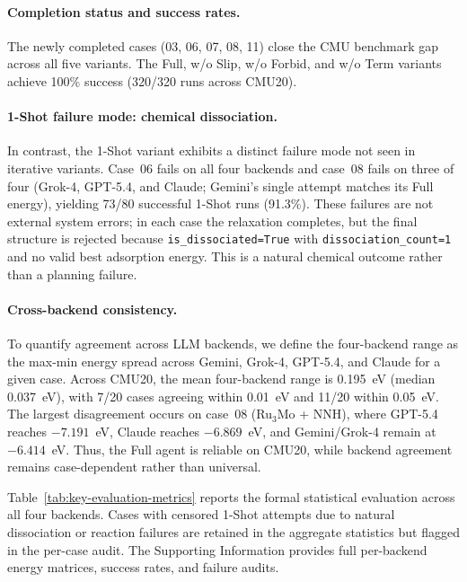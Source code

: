 \paragraph{Completion status and success rates.}
The newly completed cases (03, 06, 07, 08, 11) close the CMU benchmark gap across all five variants.
The Full, w/o Slip, w/o Forbid, and w/o Term variants achieve 100\% success (320/320 runs across CMU20).

\paragraph{1-Shot failure mode: chemical dissociation.}
In contrast, the 1-Shot variant exhibits a distinct failure mode not seen in iterative variants.
Case~06 fails on all four backends and case~08 fails on three of four (Grok-4, GPT-5.4, and Claude; Gemini's single attempt matches its Full energy), yielding 73/80 successful 1-Shot runs (91.3\%).
These failures are not external system errors; in each case the relaxation completes, but the final structure is rejected because \texttt{is\_dissociated=True} with \texttt{dissociation\_count=1} and no valid best adsorption energy.
This is a natural chemical outcome rather than a planning failure.

\paragraph{Cross-backend consistency.}
To quantify agreement across LLM backends, we define the four-backend range as the max-min energy spread across Gemini, Grok-4, GPT-5.4, and Claude for a given case.
Across CMU20, the mean four-backend range is 0.195~eV (median 0.037~eV), with 7/20 cases agreeing within 0.01~eV and 11/20 within 0.05~eV.
The largest disagreement occurs on case~08 (Ru$_3$Mo + NNH), where GPT-5.4 reaches $-7.191$~eV, Claude reaches $-6.869$~eV, and Gemini/Grok-4 remain at $-6.414$~eV.
Thus, the Full agent is reliable on CMU20, while backend agreement remains case-dependent rather than universal.

Table~\ref{tab:key-evaluation-metrics} reports the formal statistical evaluation across all four backends. Cases with censored 1-Shot attempts due to natural dissociation or reaction failures are retained in the aggregate statistics but flagged in the per-case audit. The Supporting Information provides full per-backend energy matrices, success rates, and failure audits.

